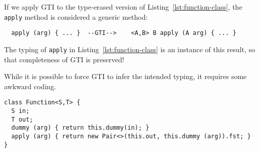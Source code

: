 If we apply GTI to the type-erased version of
Listing~\ref{lst:function-class}, the \texttt{apply} method is considered a generic method: 
\begin{lstlisting}
  apply (arg) { ... }  --GTI-->    <A,B> B apply (A arg) { ... }
\end{lstlisting}
The typing of \texttt{apply} in Listing~\ref{lst:function-class} is an
instance of this result, so that completeness of GTI is preserved!

While it is possible to  force GTI to infer the intended typing, it requires some awkward coding.
\begin{lstlisting}
class Function<S,T> {
  S in;
  T out;
  dummy (arg) { return this.dummy(in); }
  apply (arg) { return new Pair<>(this.out, this.dummy (arg)).fst; }
}
\end{lstlisting}

